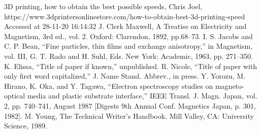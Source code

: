\documentclass[conference]{IEEEtran}
\begin{document}
\begin{thebibliography}{00}
 3D printing, how to obtain the best possible speeds, Chris Joel, https://www.3dprintersonlinestore.com/how-to-obtain-best-3d-printing-speed Accessed at 28-11-20 16:14:32
 J. Clerk Maxwell, A Treatise on Electricity and Magnetism, 3rd ed., vol. 2. Oxford: Clarendon, 1892, pp.68--73.
 I. S. Jacobs and C. P. Bean, ``Fine particles, thin films and exchange anisotropy,'' in Magnetism, vol. III, G. T. Rado and H. Suhl, Eds. New York: Academic, 1963, pp. 271--350.
 K. Elissa, ``Title of paper if known,'' unpublished.
 R. Nicole, ``Title of paper with only first word capitalized,'' J. Name Stand. Abbrev., in press.
 Y. Yorozu, M. Hirano, K. Oka, and Y. Tagawa, ``Electron spectroscopy studies on magneto-optical media and plastic substrate interface,'' IEEE Transl. J. Magn. Japan, vol. 2, pp. 740--741, August 1987 [Digests 9th Annual Conf. Magnetics Japan, p. 301, 1982].
 M. Young, The Technical Writer's Handbook. Mill Valley, CA: University Science, 1989.
\end{thebibliography}
\end{document}
